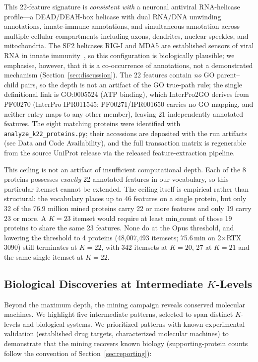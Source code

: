 \documentclass[10pt,a4paper,twocolumn]{article}
\begin{document}
This 22-feature signature is \emph{consistent with} a neuronal antiviral RNA-helicase profile---a DEAD/DEAH-box helicase with dual RNA/DNA unwinding annotations, innate-immune annotations, and simultaneous annotation across multiple cellular compartments including axons, dendrites, nuclear speckles, and mitochondria. The SF2 helicases RIG-I and MDA5 are established sensors of viral RNA in innate immunity~\cite{rehwinkel2020}, so this configuration is biologically plausible; we emphasise, however, that it is a co-occurrence of annotations, not a demonstrated mechanism (Section~\ref{sec:discussion}). The 22 features contain \emph{no} GO parent--child pairs, so the depth is not an artifact of the GO true-path rule; the single definitional link is GO:0005524 (ATP binding), which InterPro2GO derives from PF00270 (InterPro IPR011545; PF00271/IPR001650 carries no GO mapping, and neither entry maps to any other member), leaving 21 independently annotated features. The eight matching proteins were identified with \texttt{analyze\_k22\_proteins.py}; their accessions are deposited with the run artifacts (see Data and Code Availability), and the full transaction matrix is regenerable from the source UniProt release via the released feature-extraction pipeline.

This ceiling is not an artifact of insufficient computational depth. Each of the 8 proteins possesses \emph{exactly} 22 annotated features in our vocabulary, so this particular itemset cannot be extended. The ceiling itself is empirical rather than structural: the vocabulary places up to 46 features on a single protein, but only 32 of the 76.9 million mined proteins carry 22 or more features and only 19 carry 23 or more. A $K{=}23$ itemset would require at least $\text{min\_count}$ of those 19 proteins to share the same 23 features. None do at the Opus threshold, and lowering the threshold to 4 proteins (48,007,493 itemsets; 75.6\,min on 2$\times$RTX 3090) still terminates at $K{=}22$, with 342 itemsets at $K{=}20$, 27 at $K{=}21$ and the same single itemset at $K{=}22$.

\subsection{Biological Discoveries at Intermediate $K$-Levels}
\label{sec:intermediate}

Beyond the maximum depth, the mining campaign reveals conserved molecular machines. We highlight five intermediate patterns, selected to span distinct $K$-levels and biological systems. We prioritized patterns with known experimental validation (established drug targets, characterized molecular machines) to demonstrate that the mining recovers known biology (supporting-protein counts follow the convention of Section~\ref{sec:reporting}):
\end{document}
